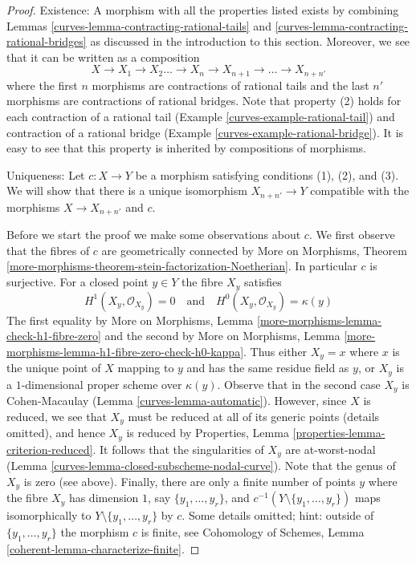 \begin{proof}

Existence: A morphism with all the properties listed exists by
combining Lemmas \ref{curves-lemma-contracting-rational-tails} and
\ref{curves-lemma-contracting-rational-bridges} as discussed in the
introduction to this section.
Moreover, we see that it can be written as a composition
$$
X \to X_1 \to X_2 \ldots \to X_n \to X_{n + 1} \to \ldots \to X_{n + n'}
$$
where the first $n$ morphisms are contractions of rational tails
and the last $n'$ morphisms are contractions of rational bridges.
Note that property (2) holds for each contraction of a rational
tail (Example \ref{curves-example-rational-tail}) and contraction of a
rational bridge (Example \ref{curves-example-rational-bridge}).
It is easy to see that this property is inherited by compositions of morphisms.

\medskip\noindent
Uniqueness: Let $c : X \to Y$ be a morphism satisfying conditions
(1), (2), and (3). We will show that there is a unique isomorphism
$X_{n + n'} \to Y$ compatible with the morphisms $X \to X_{n + n'}$ and $c$.

\medskip\noindent
Before we start the proof we make some observations about $c$.
We first observe that the fibres of $c$ are geometrically connected by
More on Morphisms, Theorem
\ref{more-morphisms-theorem-stein-factorization-Noetherian}.
In particular $c$ is surjective.
For a closed point $y \in Y$ the fibre $X_y$ satisfies
$$
H^1(X_y, \mathcal{O}_{X_y}) = 0
\quad\text{and}\quad
H^0(X_y, \mathcal{O}_{X_y}) = \kappa(y)
$$
The first equality by More on Morphisms, Lemma
\ref{more-morphisms-lemma-check-h1-fibre-zero}
and the second by More on Morphisms, Lemma
\ref{more-morphisms-lemma-h1-fibre-zero-check-h0-kappa}.
Thus either $X_y = x$ where $x$ is the unique point of $X$ mapping to
$y$ and has the same residue field as $y$, or $X_y$ is a $1$-dimensional
proper scheme over $\kappa(y)$. Observe that in the second case
$X_y$ is Cohen-Macaulay (Lemma \ref{curves-lemma-automatic}).
However, since $X$ is reduced, we see that $X_y$ must be reduced
at all of its generic points (details omitted), and hence $X_y$
is reduced by Properties, Lemma \ref{properties-lemma-criterion-reduced}.
It follows that the singularities of $X_y$ are at-worst-nodal
(Lemma \ref{curves-lemma-closed-subscheme-nodal-curve}).
Note that the genus of $X_y$ is zero (see above).
Finally, there are only a finite number of points $y$ where
the fibre $X_y$ has dimension $1$, say
$\{y_1, \ldots, y_r\}$, and $c^{-1}(Y \setminus \{y_1, \ldots, y_r\})$
maps isomorphically to $Y \setminus \{y_1, \ldots, y_r\}$ by $c$.
Some details omitted; hint: outside of $\{y_1, \ldots, y_r\}$
the morphism $c$ is finite, see
Cohomology of Schemes, Lemma \ref{coherent-lemma-characterize-finite}.


\end{proof}
